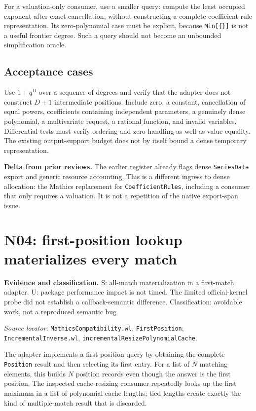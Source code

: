 \documentclass[11pt,letterpaper]{article}
\newcommand{\code}[1]{\nolinkurl{#1}}
\newcommand{\source}[1]{\par\textit{Source locator:} #1\par}
\newcommand{\status}[1]{\par\textbf{Evidence and classification.} #1\par}
\newcommand{\novelty}[1]{\par\textbf{Delta from prior reviews.} #1\par}
\begin{document}
For a valuation-only consumer, use a smaller query: compute the least
occupied exponent after exact cancellation, without constructing a complete
coefficient-rule representation. Its zero-polynomial case must be explicit,
because \code{Min[{}]} is not a useful frontier degree. Such a query should
not become an unbounded simplification oracle.

\subsection{Acceptance cases}
Use $1+q^D$ over a sequence of degrees and verify that the adapter does not
construct $D+1$ intermediate positions. Include zero, a constant, cancellation
of equal powers, coefficients containing independent parameters, a genuinely
dense polynomial, a multivariate request, a rational function, and invalid
variables. Differential tests must verify ordering and zero handling as
well as value equality. The existing output-support budget does not by
itself bound a dense temporary representation.

\novelty{The earlier register already flags dense \code{SeriesData} export
and generic resource accounting. This is a different ingress to dense
allocation: the Mathics replacement for \code{CoefficientRules}, including
a consumer that only requires a valuation. It is not a repetition of the
native export-span issue.}

\section{N04: first-position lookup materializes every match}
\label{sec:firstposition}
\status{S: all-match materialization in a first-match adapter. U: package
performance impact is not timed. The limited official-kernel probe did not
establish a callback-semantic difference. Classification: avoidable work,
not a reproduced semantic bug.}
\source{\code{MathicsCompatibility.wl}, \code{FirstPosition};
\code{IncrementalInverse.wl}, \code{incrementalResizePolynomialCache}.
\cite{repo-mcompat,repo-incremental}}

The adapter implements a first-position query by obtaining the complete
\code{Position} result and then selecting its first entry. For a list of
$N$ matching elements, this builds $N$ position records even though the
answer is the first position. The inspected cache-resizing consumer repeatedly
looks up the first maximum in a list of polynomial-cache lengths; tied
lengths create exactly the kind of multiple-match result that is discarded.
\end{document}
